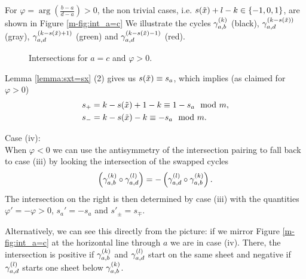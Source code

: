 \documentclass[main.tex]{subfiles}
\begin{document}
 For $\varphi = \arg\left(\frac{b-a}{d-a}\right) > 0$, the non trivial cases, i.e. $s(\tilde{x}) + l - k \in \{-1,0,1\}$, are shown in Figure \ref{m-fig:int_a=c}
  We illustrate the cycles $\gamma_{a,b}^{(k)}$ (black), $\gamma_{a,d}^{(k-s(\tilde{x}))}$ (gray), $\gamma_{a,d}^{(k-s(\tilde{x}) + 1)}$ (green) and
    $\gamma_{a,d}^{(k-s(\tilde{x})-1)}$ (red).
  \begin{figure}[H]
      \begin{center}
   \scalebox{0.8}{}
      \end{center}
    \caption{Intersections for $a=c$ and $\varphi > 0$.}
    \label{fig:int_a=c}
   \end{figure}
   Lemma \ref{lemma:sxt=sx} (2) gives us $s(\tilde{x}) \equiv s_a$, which implies (as claimed for $\varphi > 0$)
    \begin{align*}
    & s_+ = k-s(\tilde{x})+1-k \equiv 1-s_a \mod m, \\
    & s_- = k-s(\tilde{x})-k \equiv -s_a \mod m.
    \end{align*}
    
  Case (iv): \\
  When $\varphi < 0$ we can use the antisymmetry of the intersection pairing to
  fall back to case (iii) by looking the intersection of the swapped cycles
  $$\left( \gamma_{a,b}^{(k)} \circ \gamma_{a,d}^{(l)} \right) = - \left( \gamma_{a,d}^{(l)} \circ \gamma_{a,b}^{(k)} \right).$$
  The intersection on the right is then determined by case (iii) with the quantities
  $\varphi' = -\varphi > 0$, $s_a' = -s_a$ and $s'_{\pm} = s_{\mp}$. 
  
  Alternatively, we can see this directly from the picture: if we mirror Figure \ref{m-fig:int_a=c} at the horizontal line through $a$ we are in case (iv).
  There, the intersection is positive if $\gamma_{a,b}^{(k)}$ and $\gamma_{a,d}^{(l)}$ start on the same sheet and negative if $\gamma_{a,d}^{(l)}$ starts one sheet below $\gamma_{a,b}^{(k)}$.
\end{document}
